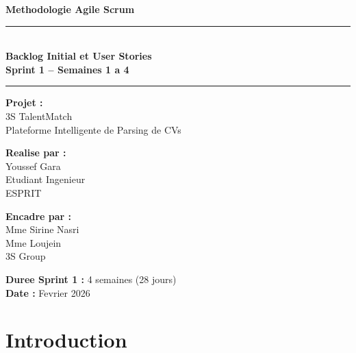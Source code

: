 ﻿\documentclass[12pt,a4paper]{report}
\begin{document}
\begin{titlepage}
    \begin{center}
        \vspace*{2cm}
        \textcolor{bleu3S}{\Large \textbf{Methodologie Agile Scrum}}\\[0.5cm]
        \rule{\textwidth}{0.4mm}\\[0.4cm]
        {\LARGE \textbf{Backlog Initial et User Stories}}\\[0.2cm]
        {\large \textbf{Sprint 1 -- Semaines 1 a 4}}\\[0.4cm]
        \rule{\textwidth}{0.4mm}
        \vspace{1.5cm}
        {\large \textbf{Projet :}}\\[0.2cm]
        {\Large 3S TalentMatch}\\
        {\large Plateforme Intelligente de Parsing de CVs}
        \vspace{2cm}
        \begin{minipage}{0.45\textwidth}
            \centering
            \textbf{Realise par :}\\[0.2cm]
            Youssef Gara\\
            Etudiant Ingenieur\\
            ESPRIT
        \end{minipage}
        \hfill
        \begin{minipage}{0.45\textwidth}
            \centering
            \textbf{Encadre par :}\\[0.2cm]
            Mme Sirine Nasri\\
            Mme Loujein\\[0.3cm]
            3S Group
        \end{minipage}
        \vspace{2cm}
        \textbf{Duree Sprint 1 :} 4 semaines (28 jours)\\
        \textbf{Date :} Fevrier 2026
    \end{center}
\end{titlepage}

\tableofcontents
\newpage

\chapter*{Introduction}
\end{document}
